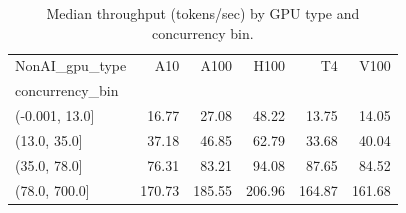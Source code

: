 \begin{table}[t]
\centering
\caption{Median throughput (tokens/sec) by GPU type and concurrency bin.}
\label{tab:nonai_workload_conc_median_throughput}
\begin{tabular}{lrrrrr}
\toprule
NonAI_gpu_type & A10 & A100 & H100 & T4 & V100 \\
concurrency_bin &  &  &  &  &  \\
\midrule
(-0.001, 13.0] & 16.77 & 27.08 & 48.22 & 13.75 & 14.05 \\
(13.0, 35.0] & 37.18 & 46.85 & 62.79 & 33.68 & 40.04 \\
(35.0, 78.0] & 76.31 & 83.21 & 94.08 & 87.65 & 84.52 \\
(78.0, 700.0] & 170.73 & 185.55 & 206.96 & 164.87 & 161.68 \\
\bottomrule
\end{tabular}

\end{table}
